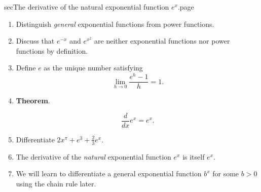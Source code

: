 \documentclass[../main]{subfiles}
\begin{document}
\begin{outline}{sec}{The derivative of the natural exponential function \texorpdfstring{\(e^{x}\)}{exp(x)}.}{page} 
  \label{act:exp}
  \begin{enumerate}
    \item Distinguish \emph{general} exponential functions from power functions. 
    \item Discuss that \(e^{-x}\) and \(e^{x^{2}}\) are neither exponential functions nor power functions by definition. 
    \item Define \(e\) as the unique number satisfying
      \[
        \lim_{h \to 0} \frac{e^{h} - 1}{h} = 1.
      \]

    \item \textbf{Theorem}. 
      \begin{mdframed}[style=simple]
        \[
          \frac{d}{dx} e^{x} = e^{x}.
        \]
      \end{mdframed}
        

    \item Differentiate \(2x^{\pi} + e^{3} + \frac{2}{3}e^{x}\).
    \item {The derivative of the \emph{natural} exponential function \(e^{x}\) is itself \(e^{x}\).}
    \item {We will learn to differentiate a general exponential function \(b^{x}\) for some \(b > 0\) using the chain rule later.}
\end{enumerate}
\end{outline}
\end{document}
